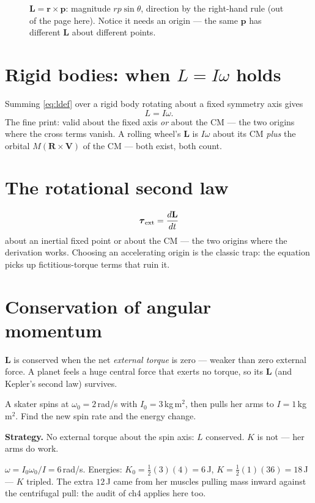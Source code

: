 \begin{figure}[htbp]\centering

\caption{$\mathbf L=\mathbf r\times\mathbf p$: magnitude $rp\sin\theta$,
direction by the right-hand rule (out of the page here). Notice it needs an
origin --- the same $\mathbf p$ has different $\mathbf L$ about different
points.}
\label{fig:lvec}
\end{figure}

\section{Rigid bodies: when $L=I\omega$ holds}\label{sec:ang-rigid}

Summing \eqref{eq:ldef} over a rigid body rotating about a fixed
symmetry axis gives
\[
  L=I\omega.
\]
The fine print: valid about the fixed axis \emph{or} about the CM --- the
two origins where the cross terms vanish. A rolling wheel's $\mathbf L$ is
$I\omega$ about its CM \emph{plus} the orbital $M(\mathbf R\times\mathbf V)$
of the CM --- both exist, both count.

\section{The rotational second law}\label{sec:ang-taul}

\begin{equation}
  \boldsymbol\tau_{\rm ext}=\frac{d\mathbf L}{dt}\label{eq:taul}
\end{equation}
about an inertial fixed point or about the CM --- the two origins where the
derivation works. Choosing an accelerating origin is the classic trap: the
equation picks up fictitious-torque terms that ruin it.

\section{Conservation of angular momentum}\label{sec:ang-cons}

\begin{principle}
$\mathbf L$ is conserved when the net \emph{external torque} is zero ---
weaker than zero external force. A planet feels a huge central force that
exerts no torque, so its $\mathbf L$ (and Kepler's second law) survives.
\end{principle}

\begin{example}\label{ex:skater}
A skater spins at $\omega_0=2$\,rad/s with $I_0=3$\,kg\,m$^{2}$, then pulls
her arms to $I=1$\,kg\,m$^{2}$. Find the new spin rate and the energy
change.
\par\smallskip
\textbf{Strategy.} No external torque about the spin axis: $L$ conserved.
$K$ is not --- her arms do work.
\begin{solution}
$\omega=I_0\omega_0/I=6$\,rad/s. Energies:
$K_0=\tfrac12(3)(4)=6$\,J, $K=\tfrac12(1)(36)=18$\,J --- $K$ tripled. The
extra $12$\,J came from her muscles pulling mass inward against the
centrifugal pull: the audit of ch4 applies here too. \checkmark
\end{solution}
\end{example}

